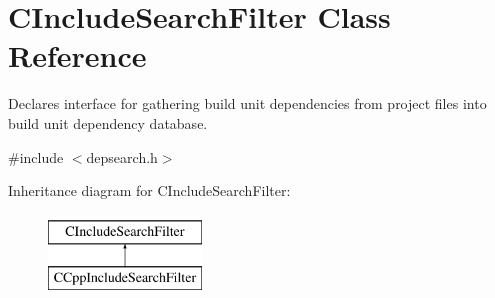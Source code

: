 \hypertarget{classCIncludeSearchFilter}{\section{C\-Include\-Search\-Filter Class Reference}
\label{classCIncludeSearchFilter}
}


Declares interface for gathering build unit dependencies from project files into build unit dependency database.  




{\ttfamily \#include $<$depsearch.\-h$>$}

Inheritance diagram for C\-Include\-Search\-Filter\-:\begin{figure}[H]
\begin{center}
\leavevmode
\includegraphics[height=2.000000cm]{d2/d24/classCIncludeSearchFilter}
\end{center}
\end{figure}
